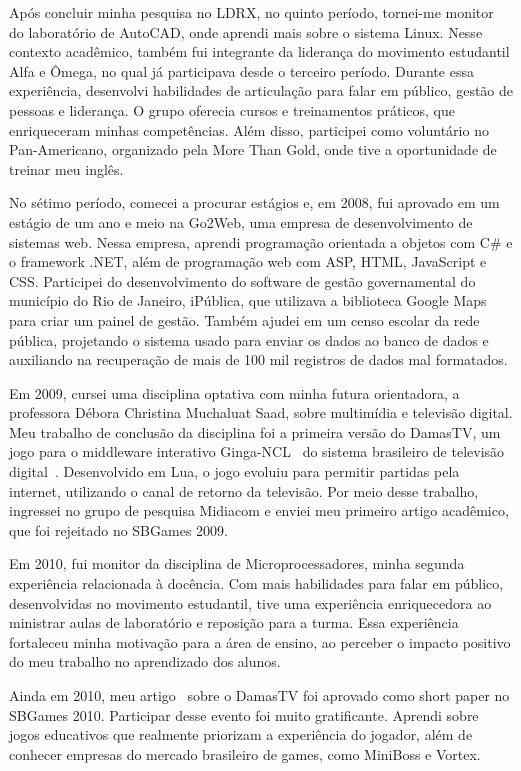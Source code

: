 \documentclass[10pt,a4paper,oneside]{book}
\begin{document}
Após concluir minha pesquisa no LDRX, no quinto período, tornei-me monitor do laboratório de AutoCAD, onde aprendi mais
sobre o sistema Linux. Nesse contexto acadêmico, também fui integrante da liderança do movimento estudantil Alfa e Ômega,
no qual já participava desde o terceiro período. Durante essa experiência, desenvolvi habilidades de articulação para
falar em público, gestão de pessoas e liderança. O grupo oferecia cursos e treinamentos práticos, que enriqueceram
minhas competências. Além disso, participei como voluntário no Pan-Americano, organizado pela More Than Gold, onde
tive a oportunidade de treinar meu inglês.

No sétimo período, comecei a procurar estágios e, em 2008, fui aprovado em um estágio de um ano e meio na Go2Web, uma
empresa de desenvolvimento de sistemas web. Nessa empresa, aprendi programação orientada a objetos com C\# e o framework
.NET, além de programação web com ASP, HTML, JavaScript e CSS. Participei do desenvolvimento do software de gestão
governamental do município do Rio de Janeiro, iPública, que utilizava a biblioteca Google Maps para criar um painel
de gestão. Também ajudei em um censo escolar da rede pública, projetando o sistema usado para enviar os dados ao banco
de dados e auxiliando na recuperação de mais de 100 mil registros de dados mal formatados.

Em 2009, cursei uma disciplina optativa com minha futura orientadora, a professora Débora Christina Muchaluat Saad,
sobre multimídia e televisão digital. Meu trabalho de conclusão da disciplina foi a primeira versão do DamasTV, um jogo
para o middleware interativo Ginga-NCL~\cite{soares2007ginga} do sistema brasileiro de televisão
digital~\cite{mendes2007sbtvd}. Desenvolvido em Lua, o jogo evoluiu para permitir partidas pela internet, utilizando o
canal de retorno da televisão. Por meio desse trabalho, ingressei no grupo de pesquisa Midiacom e enviei meu primeiro
artigo acadêmico, que foi rejeitado no SBGames 2009.

Em 2010, fui monitor da disciplina de Microprocessadores, minha segunda experiência relacionada à docência. Com mais
habilidades para falar em público, desenvolvidas no movimento estudantil, tive uma experiência enriquecedora ao
ministrar aulas de laboratório e reposição para a turma. Essa experiência fortaleceu minha motivação para a área de
ensino, ao perceber o impacto positivo do meu trabalho no aprendizado dos alunos.

Ainda em 2010, meu artigo~\cite{saad2010damastv} sobre o DamasTV foi aprovado como short paper no SBGames 2010.
Participar desse evento foi muito gratificante. Aprendi sobre jogos educativos que realmente priorizam a experiência
do jogador, além de conhecer empresas do mercado brasileiro de games, como MiniBoss e Vortex.
\end{document}
